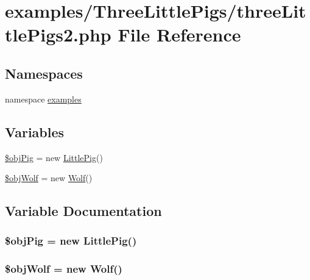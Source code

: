 \hypertarget{three_little_pigs2_8php}{
\section{examples/ThreeLittlePigs/threeLittlePigs2.php File Reference}
\label{three_little_pigs2_8php}
}
\subsection*{Namespaces}
\begin{CompactItemize}
\item 
namespace \hyperlink{namespaceexamples}{examples}
\end{CompactItemize}
\subsection*{Variables}
\begin{CompactItemize}
\item 
\hyperlink{three_little_pigs2_8php_eeadc4737b5ad49aa0a56c7bbbafdffe}{\$objPig} = new \hyperlink{class_little_pig}{LittlePig}()
\item 
\hyperlink{three_little_pigs2_8php_7f33d1ae25d8f6e2bc5e59c96b293fd8}{\$objWolf} = new \hyperlink{class_wolf}{Wolf}()
\end{CompactItemize}


\subsection{Variable Documentation}
\hypertarget{three_little_pigs2_8php_eeadc4737b5ad49aa0a56c7bbbafdffe}{
\subsubsection[{\$objPig}]{\setlength{\rightskip}{0pt plus 5cm}\$objPig = new {\bf LittlePig}()}}
\label{three_little_pigs2_8php_eeadc4737b5ad49aa0a56c7bbbafdffe}


\hypertarget{three_little_pigs2_8php_7f33d1ae25d8f6e2bc5e59c96b293fd8}{
\subsubsection[{\$objWolf}]{\setlength{\rightskip}{0pt plus 5cm}\$objWolf = new {\bf Wolf}()}}
\label{three_little_pigs2_8php_7f33d1ae25d8f6e2bc5e59c96b293fd8}


